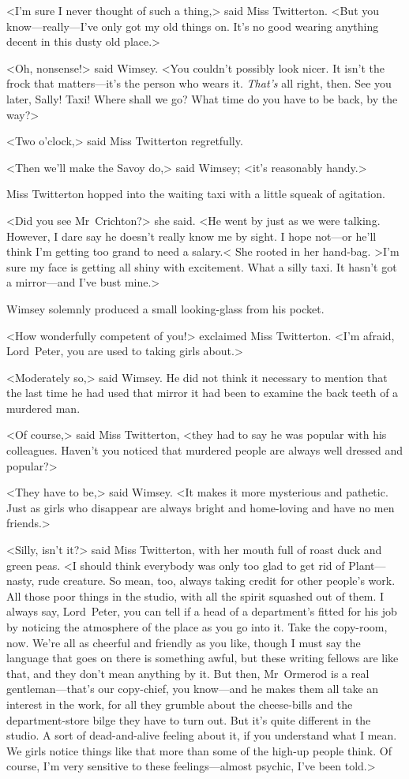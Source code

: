 <I'm sure I never thought of such a thing,> said Miss Twitterton. <But you know—really—I've only got my old things on. It's no good wearing anything decent in this dusty old place.>

<Oh, nonsense!> said Wimsey. <You couldn't possibly look nicer. It isn't the frock that matters—it's the person who wears it. \textit{That's} all right, then. See you later, Sally! Taxi! Where shall we go? What time do you have to be back, by the way?>

<Two o'clock,> said Miss Twitterton regretfully.

<Then we'll make the Savoy do,> said Wimsey; <it's reasonably handy.>

Miss Twitterton hopped into the waiting taxi with a little squeak of agitation.

<Did you see Mr~Crichton?> she said. <He went by just as we were talking. However, I dare say he doesn't really know me by sight. I hope not—or he'll think I'm getting too grand to need a salary.< She rooted in her hand-bag. >I'm sure my face is getting all shiny with excitement. What a silly taxi. It hasn't got a mirror—and I've bust mine.>

Wimsey solemnly produced a small looking-glass from his pocket.

<How wonderfully competent of you!> exclaimed Miss Twitterton. <I'm afraid, Lord~Peter, you are used to taking girls about.>

<Moderately so,> said Wimsey. He did not think it necessary to mention that the last time he had used that mirror it had been to examine the back teeth of a murdered man.

<Of course,> said Miss Twitterton, <they had to say he was popular with his colleagues. Haven't you noticed that murdered people are always well dressed and popular?>

<They have to be,> said Wimsey. <It makes it more mysterious and pathetic. Just as girls who disappear are always bright and home-loving and have no men friends.>

<Silly, isn't it?> said Miss Twitterton, with her mouth full of roast duck and green peas. <I should think everybody was only too glad to get rid of Plant—nasty, rude creature. So mean, too, always taking credit for other people's work. All those poor things in the studio, with all the spirit squashed out of them. I always say, Lord~Peter, you can tell if a head of a department's fitted for his job by noticing the atmosphere of the place as you go into it. Take the copy-room, now. We're all as cheerful and friendly as you like, though I must say the language that goes on there is something awful, but these writing fellows are like that, and they don't mean anything by it. But then, Mr~Ormerod is a real gentleman—that's our copy-chief, you know—and he makes them all take an interest in the work, for all they grumble about the cheese-bills and the department-store bilge they have to turn out. But it's quite different in the studio. A sort of dead-and-alive feeling about it, if you understand what I mean. We girls notice things like that more than some of the high-up people think. Of course, I'm very sensitive to these feelings—almost psychic, I've been told.>


